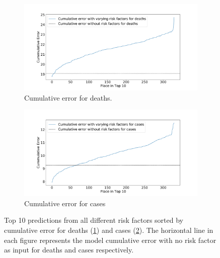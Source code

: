 \documentclass[a4paper, inpress]{jds} %
\renewcommand{\_}{%
    \textunderscore\hspace{0pt}%
}
\begin{document}
\begin{figure}[!htbp]
    \begin{subfigure}{.95\textwidth}
        \centering
        \includegraphics[width=1.0\textwidth]{images/predict/PlaceTop10_DeathNEW3.pdf}
        \caption{Cumulative error for deaths.}
        \label{fig:place-top10-death}
    \end{subfigure}
    \begin{subfigure}{.95\textwidth}
        \centering
        \includegraphics[width=1.0\textwidth]{images/predict/PlaceTop10_CasesNEW3.pdf}
        \caption{Cumulative error for cases}
        \label{fig:place-top10-cases}
    \end{subfigure}

    \caption{Top 10 predictions from all different risk factors sorted by cumulative error for deaths (\ref{fig:place-top10-death}) and cases (\ref{fig:place-top10-cases}). The horizontal line in each figure represents the model cumulative error with no risk factor as input for deaths and cases respectively.}
    \label{fig:place-top10-both}
    
    
\end{figure}
\end{document}
